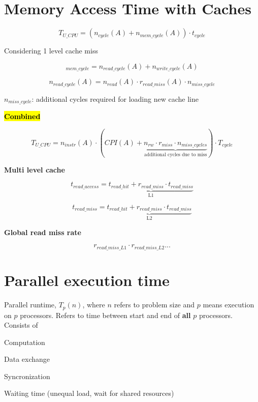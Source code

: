 \documentclass[12pt]{article}
\begin{document}
\begin{spacing}{1.5}
\begin{center}
\end{center}

\section{Memory Access Time with Caches}

$$T_{U\_CPU} = (n_{cycle}(A) + n_{mem\_cycle}(A)) \cdot t_{cycle}$$

Considering 1 level cache miss

$$_{mem\_cycle} = n_{read\_cycle}(A) + n_{write\_cycle}(A)$$

$$n_{read\_cycle}(A) = n_{read}(A) \cdot r_{read\_miss}(A) \cdot n_{miss\_cycle}$$

$n_{miss\_cycle}$: additional cycles required for loading new cache line

\textbf{\hl{Combined}}

$$T_{U\_CPU} = n_{instr}(A) \cdot ( CPI(A) + \underbrace{n_{rw} \cdot r_{miss} \cdot n_{miss\_cycles}}_{\text{additional cycles due to miss}} ) \cdot T_{cycle}$$

\textbf{Multi level cache}

$$t_{read\_access} = \underbrace{t_{read\_hit} + r_{read\_miss} \cdot t_{read\_miss}}_{\text{L1}}$$

$$t_{read\_miss} = \underbrace{t_{read\_hit} + r_{read\_miss} \cdot t_{read\_miss}}_{\text{L2}}$$

\textbf{Global read miss rate}

$$r_{read\_miss\_L1} \cdot r_{read\_miss\_L2} ...$$

\section{Parallel execution time}

Parallel runtime, $T_p (n)$, where $n$ refers to problem size and $p$ means execution on $p$ processors. Refers to time between start and end of \textbf{all} $p$ processors. Consists of 

\begin{itemize*}
	\item Computation
	\item Data exchange
	\item Syncronization
	\item Waiting time (unequal load, wait for shared resources)
\end{itemize*}


\end{spacing}
\end{document}
